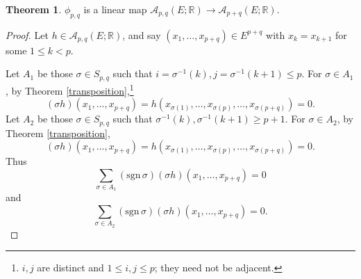 \documentclass{article}
\newcommand{\sgn}{\mathrm{sgn}\,}
\theoremstyle{definition}
\newtheorem{theorem}{Theorem}
\theoremstyle{definition}
\begin{document}
\begin{theorem}
$\phi_{p,q}$ is a linear map $\mathscr{A}_{p,q}(E;\mathbb{R}) \to \mathscr{A}_{p+q}(E;\mathbb{R})$.
\end{theorem}
\begin{proof}
Let $h \in \mathscr{A}_{p,q}(E;\mathbb{R})$,
and say $(x_1,\ldots,x_{p+q}) \in E^{p+q}$ with $x_k=x_{k+1}$ for some $1 \leq k < p$.

Let $A_1$ be those $\sigma \in S_{p,q}$ such that  $i=\sigma^{-1}(k), j=\sigma^{-1}(k+1) \leq p$. For $\sigma \in A_1$,
by Theorem \ref{transposition},\footnote{$i,j$ are distinct and $1 \leq i,j \leq p$; they need not be adjacent.}
\[
(\sigma h)(x_1,\ldots,x_{p+q})=h(x_{\sigma(1)},\ldots,x_{\sigma(p)},\ldots,x_{\sigma(p+q)})=0.
\]
Let $A_2$ be those $\sigma \in S_{p,q}$ such that $\sigma^{-1}(k), \sigma^{-1}(k+1) \geq p+1$. For $\sigma \in A_2$,
by Theorem \ref{transposition},
\[
(\sigma h)(x_1,\ldots,x_{p+q}) = h(x_{\sigma(1)},\ldots,x_{\sigma(p)},\ldots,x_{\sigma(p+q)})=0.
\]
Thus
\[
\sum_{\sigma \in A_1} (\sgn \sigma) (\sigma h)(x_1,\ldots,x_{p+q})=0
\]
and
\[
\sum_{\sigma \in A_2} (\sgn \sigma) (\sigma h)(x_1,\ldots,x_{p+q})=0.
\]


\end{proof}
\end{document}
